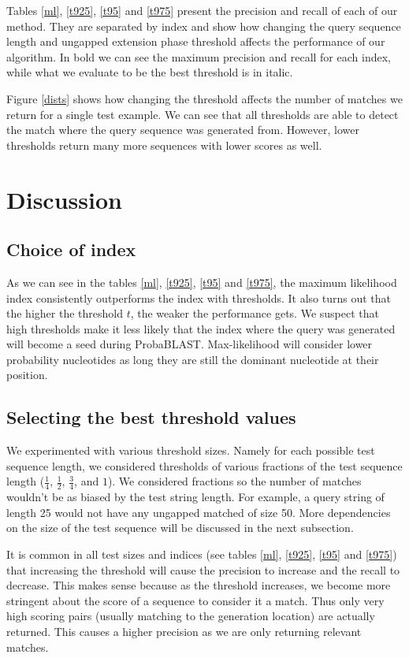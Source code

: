 \documentclass[11pt]{IEEEtran}
\begin{document}
Tables \ref{ml}, \ref{t925}, \ref{t95} and \ref{t975} present the precision and recall of each of our method. They are separated by index and show how changing the query sequence length and ungapped extension phase threshold affects the performance of our algorithm. In bold we can see the maximum precision and recall for each index, while what we evaluate to be the best threshold is in italic.

Figure \ref{dists} shows how changing the threshold affects the number of matches we return for a single test example. We can see that all thresholds are able to detect the match where the query sequence was generated from. However, lower thresholds return many more sequences with lower scores as well.

\section{Discussion}

\subsection{Choice of index}

As we can see in the tables \ref{ml}, \ref{t925}, \ref{t95} and \ref{t975}, the maximum likelihood index consistently outperforms the index with thresholds. It also turns out that the higher the threshold $t$, the weaker the performance gets. We suspect that high thresholds make it less likely that the index where the query was generated will become a seed during ProbaBLAST. Max-likelihood will consider lower probability nucleotides as long they are still the dominant nucleotide at their position.

\subsection{Selecting the best threshold values}

We experimented with various threshold sizes. Namely for each possible test sequence length, we considered thresholds of various fractions of the test sequence length ($\frac{1}{4}$, $\frac{1}{2}$, $\frac{3}{4}$, and $1$). We considered fractions so the number of matches wouldn't be as biased by the test string length. For example, a query string of length 25 would not have any ungapped matched of size 50. More dependencies on the size of the test sequence will be discussed in the next subsection.

It is common in all test sizes and indices (see tables \ref{ml}, \ref{t925}, \ref{t95} and \ref{t975}) that increasing the threshold will cause the precision to increase and the recall to decrease. 
This makes sense because as the threshold increases, we become more stringent about the score of a sequence to consider it a match. Thus only very high scoring pairs (usually matching to the generation location) are actually returned. This causes a higher precision as we are only returning relevant matches.
\end{document}
